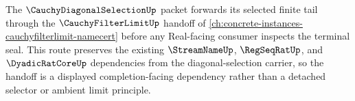 The $\CauchyDiagonalSelectionUp$ packet forwards its selected finite tail through the $\CauchyFilterLimitUp$ handoff of \autoref{ch:concrete-instances-cauchyfilterlimit-namecert} before any Real-facing consumer inspects the terminal seal. This route preserves the existing $\StreamNameUp$, $\RegSeqRatUp$, and $\DyadicRatCoreUp$ dependencies from the diagonal-selection carrier, so the handoff is a displayed completion-facing dependency rather than a detached selector or ambient limit principle.
